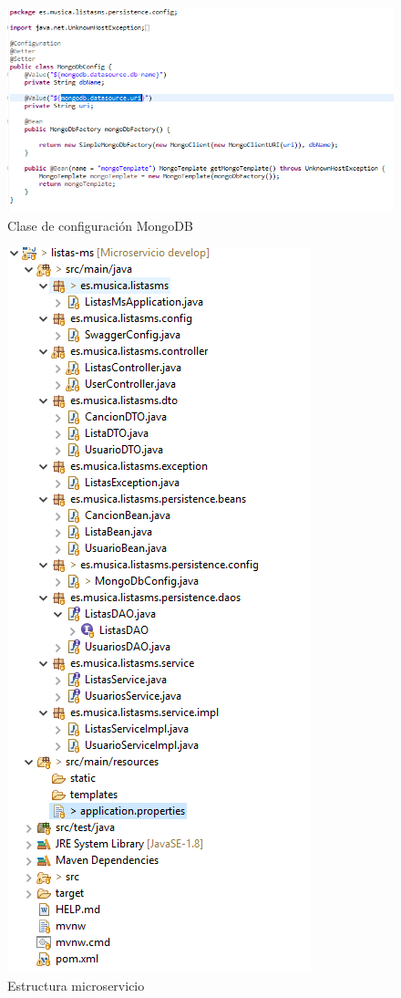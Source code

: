 \documentclass[12pt]{report} %
\begin{document}
\begin{figure}
	\centering
	\includegraphics[width=0.7\linewidth]{imagenes/configMongo}
	\caption{Clase de configuración MongoDB}
	\label{fig:configmongo}
\end{figure}


\begin{figure}
	\centering
	\includegraphics[width=0.7\linewidth]{imagenes/estructuramicroservicio}
	\caption{Estructura microservicio}
	\label{fig:estructura-microservicio}
\end{figure}
\end{document}
